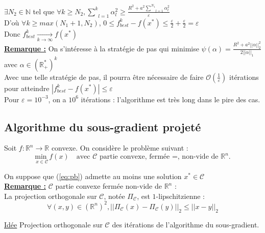 \documentclass[12pt,a4paper]{article}
\begin{document}
$\exists N_2 \in \mathbb{N}$ tel que $\forall k \geq N_2, \underset{l = 1}{\overset{k}{\sum}} \alpha_l^2 \geq \frac{R^2 + a^2 \underset{l = 1}{\overset{N_1}{\sum}} \alpha_l^2}{\varepsilon}$\\

D'où $\forall k \geq max(N_1 + 1, N_2)$, $0 \leq f^k_{best} - f(x^*) \leq \frac{\varepsilon}{2} + \frac{\varepsilon}{2} = \varepsilon$\\

Donc $f^k_{best} \xrightarrow[k \rightarrow \infty]{} f(x^*)$\\




\noindent\underline{\textbf{Remarque :}}
On s'intéresse à la stratégie de pas qui minimise $\psi(\alpha) = \frac{R^2 + a^2 ||\alpha ||_2^2}{2 ||\alpha||_1}$ avec $\alpha \in (\mathbb{R}_+^*)^k$\\
Avec une telle stratégie de pas, il pourra être nécessaire de faire $\mathcal{O}(\frac{1}{\varepsilon})$ itérations pour atteindre $|f^k_{best} - f(x^*)| \leq \varepsilon$\\
Pour $\varepsilon = 10^{-3}$, on a $10^6$ itérations : l'algorithme est très long dans le pire des cas.\\


\subsection{Algorithme du sous-gradient projeté}

Soit $f : \mathbb{R}^n \rightarrow \mathbb{R}$ convexe. On considère le problème suivant :\\
\begin{equation}
    \underset{x \in \mathcal{C}}{\text{min }} f(x) \quad \text{avec } \mathcal{C} \text{ partie convexe, fermée =, non-vide de } \mathbb{R}^n.
    \label{eq:pb}
\end{equation}

On suppose que (\ref{eq:pb}) admette au moins une solution $x^* \in \mathcal{C}$\\


\noindent \underline{\textbf{Remarque :}}
$\mathcal{C}$ partie convexe fermée non-vide de $\mathbb{R}^n$ :\\
La projection orthogonale sur $\mathcal{C}$, notée $\Pi_{\mathcal{C}}$, est $1$-lipschitzienne :
$$
\forall (x, y) \in (\mathbb{R}^n)^2, ||\Pi_{\mathcal{C}}(x) - \Pi_{\mathcal{C}}(y)||_2 \leq ||x - y||_2
$$

\noindent \underline{Idée}
Projection orthogonale sur $\mathcal{C}$ des itérations de l'algorithme du sous-gradient.\\
\end{document}
